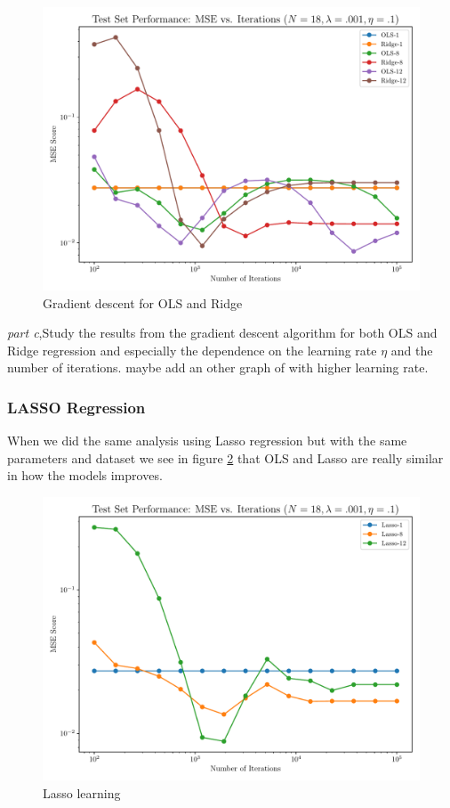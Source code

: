 \documentclass[amssymb,twocolumn,aps]{revtex4}
\begin{document}
\begin{figure}[h]
    \centering
    \includegraphics[width=.95 \linewidth]{Figures/Gradient_Comparison_OLS_Ridge_18.pdf}
    \caption{Gradient descent for OLS and Ridge}
    \label{fig:DescOLSRidge}
\end{figure}




\textit{part c},Study the results from the gradient descent algorithm for both OLS and Ridge regression and especially the dependence on the learning rate $\eta$ and the number of iterations. maybe add an other graph of with higher learning rate.



\subsubsection{LASSO Regression}
When we did the same analysis using Lasso regression but with the same parameters and dataset we see in figure \ref{fig:Lasso1} that OLS and Lasso are really similar in how the models improves.


\begin{figure}[h]
    \centering
    \includegraphics[width=.95 \linewidth]{Figures/Lasso_MSE.pdf}
    \caption{Lasso learning}
    \label{fig:Lasso1}
\end{figure}
\end{document}
